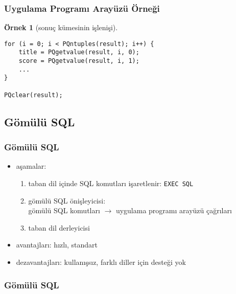 \documentclass[dvipsnames]{beamer}
\theoremstyle{definition}
\theoremstyle{example}
\newtheorem{ornek}[theorem]{Örnek}
\theoremstyle{plain}
\begin{document}
\begin{frame}[fragile]
  \frametitle{Uygulama Programı Arayüzü Örneği}

  \begin{ornek}[sonuç kümesinin işlenişi]
    \begin{lstlisting}
for (i = 0; i < PQntuples(result); i++) {
    title = PQgetvalue(result, i, 0);
    score = PQgetvalue(result, i, 1);
    ...
}

PQclear(result);
    \end{lstlisting}
  \end{ornek}
\end{frame}

\lstset{language=EmbeddedSQL}

\subsection{Gömülü SQL}

\begin{frame}
  \frametitle{Gömülü SQL}

  \begin{itemize}
    \item aşamalar:
    \begin{enumerate}
      \item taban dil içinde SQL komutları işaretlenir: \lstinline!EXEC SQL!
      \item gömülü SQL önişleyicisi:\\
        gömülü SQL komutları $\rightarrow$ uygulama programı arayüzü çağrıları
      \item taban dil derleyicisi
    \end{enumerate}

    \pause
    \bigskip
    \item avantajları: hızlı, standart
    \item dezavantajları: kullanışsız, farklı diller için desteği yok

    \bigskip
    \hyperlink{odbc}{}
  \end{itemize}
\end{frame}

\begin{frame}
  \frametitle{Gömülü SQL}

  \begin{center}
  \end{center}
\end{frame}
\end{document}
